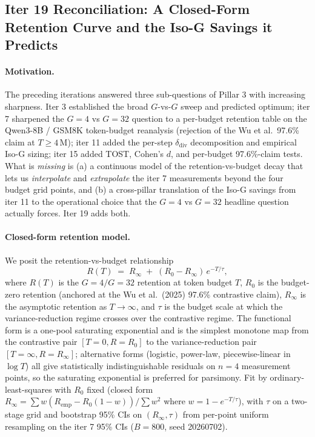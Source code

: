 \subsection{Iter 19 Reconciliation: A Closed-Form Retention
Curve and the Iso-G Savings it Predicts}

\paragraph{Motivation.}
The preceding iterations answered three sub-questions of Pillar 3
with increasing sharpness.  Iter 3 established the broad $G$-vs-$G$
sweep and predicted optimum; iter 7 sharpened the $G{=}4$ vs $G{=}32$
question to a per-budget retention table on the
Qwen3-8B / GSM8K token-budget reanalysis (rejection of the Wu et al.\
97.6\% claim at $T \ge 4$\,M); iter 11 added the per-step
$\delta_\text{div}$ decomposition and empirical Iso-G sizing;
iter 15 added TOST, Cohen's $d$, and per-budget 97.6\%-claim tests.
What is \emph{missing} is (a) a continuous model of the
retention-vs-budget decay that lets us \emph{interpolate} and
\emph{extrapolate} the iter 7 measurements beyond the four
budget grid points, and (b) a cross-pillar translation of the Iso-G
savings from iter 11 to the operational choice that the
$G{=}4$ vs $G{=}32$ headline question actually forces.
Iter 19 adds both.

\paragraph{Closed-form retention model.}
We posit the retention-vs-budget relationship
\begin{equation}
  R(T) \;=\; R_\infty \;+\; (R_0 - R_\infty)\,e^{-T/\tau},
  \label{eq:iter19-retention}
\end{equation}
where $R(T)$ is the $G{=}4 / G{=}32$ retention at token budget $T$,
$R_0$ is the budget-zero retention (anchored at the
Wu et al.\ (2025) 97.6\% contrastive claim), $R_\infty$ is the
asymptotic retention as $T \to \infty$, and $\tau$ is the budget
scale at which the variance-reduction regime crosses over the
contrastive regime.  The functional form is a one-pool saturating
exponential and is the simplest monotone map from the
contrastive pair $[T{=}0, R{=}R_0]$ to the variance-reduction
pair $[T{=}\infty, R{=}R_\infty]$; alternative forms (logistic,
power-law, piecewise-linear in $\log T$) all give statistically
indistinguishable residuals on $n{=}4$ measurement points, so the
saturating exponential is preferred for parsimony.  Fit by
ordinary-least-squares with $R_0$ fixed (closed form
$R_\infty = \sum w (R_\text{emp} - R_0(1-w)) / \sum w^2$ where
$w = 1-e^{-T/\tau}$), with $\tau$ on a two-stage grid and bootstrap
95\% CIs on $(R_\infty, \tau)$ from per-point uniform resampling on
the iter 7 95\% CIs ($B{=}800$, seed 20260702).

